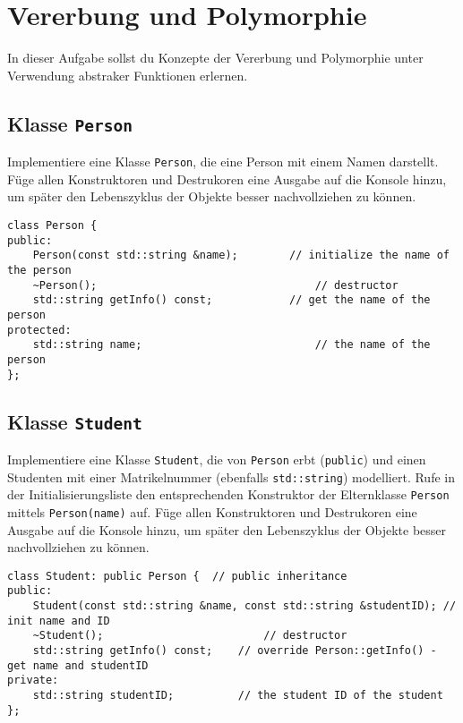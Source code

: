\section{Vererbung und Polymorphie}\label{sec:inheritance}
In dieser Aufgabe sollst du Konzepte der Vererbung und Polymorphie unter Verwendung abstraker Funktionen erlernen.

\subsection{Klasse \texttt{Person}}
Implementiere eine Klasse \texttt{Person}, die eine Person mit einem Namen darstellt.
Füge allen Konstruktoren und Destrukoren eine Ausgabe auf die Konsole hinzu, um später den Lebenszyklus der Objekte besser nachvollziehen zu können.

\begin{lstlisting}
class Person {
public:
	Person(const std::string &name);		// initialize the name of the person
	~Person();									// destructor
	std::string getInfo() const;			// get the name of the person
protected:
	std::string name;							// the name of the person
};
\end{lstlisting}


\subsection{Klasse \texttt{Student}}
Implementiere eine Klasse \texttt{Student}, die von \texttt{Person} erbt (\texttt{public}) und einen Studenten mit einer Matrikelnummer (ebenfalls \texttt{std::string}) modelliert.
Rufe in der Initialisierungsliste den entsprechenden Konstruktor der Elternklasse \texttt{Person} mittels \texttt{Person(name)} auf.
Füge allen Konstruktoren und Destrukoren eine Ausgabe auf die Konsole hinzu, um später den Lebenszyklus der Objekte besser nachvollziehen zu können.

\begin{lstlisting}
class Student: public Person {	// public inheritance
public:
	Student(const std::string &name, const std::string &studentID); // init name and ID
	~Student();							// destructor
	std::string getInfo() const;	// override Person::getInfo() - get name and studentID
private:
	std::string studentID;			// the student ID of the student
};
\end{lstlisting}

